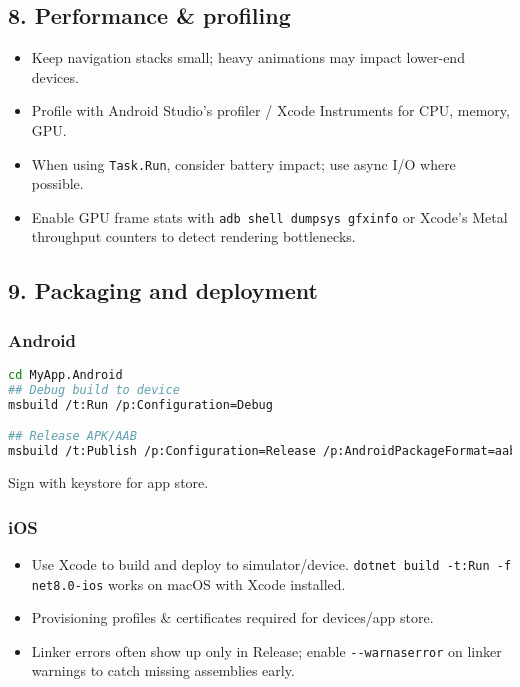 \subsection{8. Performance \& profiling}\label{performance-profiling}

\begin{itemize}
\tightlist
\item
  Keep navigation stacks small; heavy animations may impact lower-end
  devices.
\item
  Profile with Android Studio's profiler / Xcode Instruments for CPU,
  memory, GPU.
\item
  When using \passthrough{\lstinline!Task.Run!}, consider battery
  impact; use async I/O where possible.
\item
  Enable GPU frame stats with
  \passthrough{\lstinline!adb shell dumpsys gfxinfo!} or Xcode's Metal
  throughput counters to detect rendering bottlenecks.
\end{itemize}

\subsection{9. Packaging and deployment}\label{packaging-and-deployment}

\subsubsection{Android}\label{android}

\begin{lstlisting}[language=bash]
cd MyApp.Android
## Debug build to device
msbuild /t:Run /p:Configuration=Debug

## Release APK/AAB
msbuild /t:Publish /p:Configuration=Release /p:AndroidPackageFormat=aab
\end{lstlisting}

Sign with keystore for app store.

\subsubsection{iOS}\label{ios}

\begin{itemize}
\tightlist
\item
  Use Xcode to build and deploy to simulator/device.
  \passthrough{\lstinline!dotnet build -t:Run -f net8.0-ios!} works on
  macOS with Xcode installed.
\item
  Provisioning profiles \& certificates required for devices/app store.
\item
  Linker errors often show up only in Release; enable
  \passthrough{\lstinline!--warnaserror!} on linker warnings to catch
  missing assemblies early.
\end{itemize}

